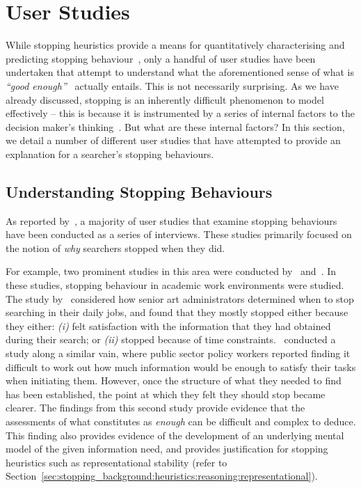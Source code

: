 \section{User Studies}\label{sec:stopping_background:user_studies}
While stopping heuristics provide a means for quantitatively characterising and predicting stopping behaviour~\citep{wu2014information_scent}, only a handful of user studies have been undertaken that attempt to understand what the aforementioned sense of what is \emph{``good enough''}~\citep{zach2005enough_is_enough} actually entails. This is not necessarily surprising. As we have already discussed, stopping is an inherently difficult phenomenon to model effectively -- this is because it is instrumented by a series of internal factors to the decision maker's thinking~\citep{nickles1995judgment}. But what are these internal factors? In this section, we detail a number of different user studies that have attempted to provide an explanation for a searcher's stopping behaviours.

\subsection{Understanding Stopping Behaviours}\label{sec:stopping_background:user_studies:understanding}

As reported by~\cite{wu2014information_scent}, a majority of user studies that examine stopping behaviours have been conducted as a series of interviews. These studies primarily focused on the notion of \emph{why} searchers stopped when they did.

For example, two prominent studies in this area were conducted by~\cite{zach2005enough_is_enough} and~\cite{berryman2006defines}. In these studies, stopping behaviour in academic work environments were studied. The study by~\cite{zach2005enough_is_enough} considered how senior art administrators determined when to stop searching in their daily jobs, and found that they mostly stopped either because they either: \emph{(i)} felt satisfaction with the information that they had obtained during their search; or \emph{(ii)} stopped because of time constraints.~\cite{berryman2006defines} conducted a study along a similar vain, where public sector policy workers reported finding it difficult to work out how much information would be enough to satisfy their tasks when initiating them. However, once the structure of what they needed to find has been established, the point at which they felt they should stop became clearer. The findings from this second study provide evidence that the assessments of what constitutes as \emph{enough} can be difficult and complex to deduce. This finding also provides evidence of the development of an underlying mental model of the given information need, and provides justification for stopping heuristics such as representational stability (refer to Section~\ref{sec:stopping_background:heuristics:reasoning:representational}).

